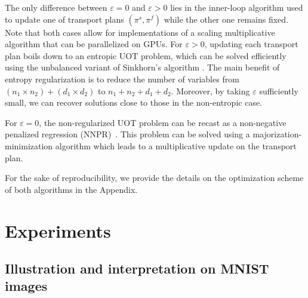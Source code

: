 The only difference between $\varepsilon = 0$ and $\varepsilon > 0$
lies in the inner-loop algorithm used to update one of transport plans $(\pi^s, \pi^f)$
while the other one remains fixed. Note that both cases allow for
implementations of a scaling multiplicative algorithm that can be parallelized on GPUs.
For $\varepsilon > 0$, updating each transport plan boils down to an entropic UOT problem,
which can be solved efficiently using the unbalanced variant of Sinkhorn's algorithm \citep{Chizat18a}.
The main benefit of entropy regularization is to reduce the number of variables
from $(n_1 \times n_2) + (d_1 \times d_2)$ to $n_1 + n_2 + d_1 + d_2$.
Moreover, by taking $\varepsilon$ sufficiently small, we can recover solutions
close to those in the non-entropic case.

For $\varepsilon=0$, the non-regularized UOT problem can be recast as a
non-negative penalized regression (NNPR)~\citep{Chapel21}.
This problem can be solved using a majorization-minimization algorithm
which leads to a multiplicative update on the transport plan.

For the sake of reproducibility, we provide the details on the optimization scheme
of both algorithms in the Appendix.

\section{Experiments} \label{sec:experiments}
\subsection{Illustration and interpretation on MNIST images}

